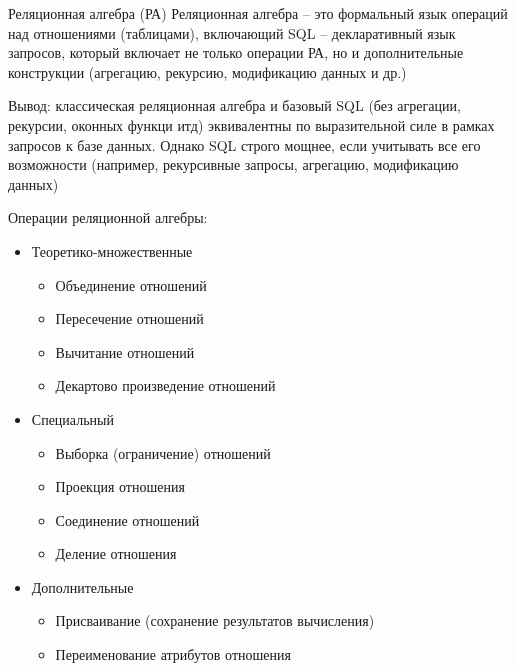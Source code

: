 \documentclass[12pt]{article}
\begin{document}
\begin{defin}{Реляционная алгебра (РА)}
    Реляционная алгебра -- это формальный язык операций над отношениями (таблицами), включающий SQL -- декларативный язык запросов, который включает не только операции РА, но и дополнительные конструкции (агрегацию, рекурсию, модификацию данных и др.)

    Вывод: классическая реляционная алгебра и базовый SQL (без агрегации, рекурсии, оконных функци итд) эквивалентны по выразительной силе в рамках запросов к базе данных. Однако SQL строго мощнее, если учитывать все его возможности (например, рекурсивные запросы, агрегацию, модификацию данных)

    Операции реляционной алгебры:

    \begin{itemize}
        \item Теоретико-множественные
        
        \begin{itemize}
            \item Объединение отношений 
            \item Пересечение отношений
            \item Вычитание отношений 
            \item Декартово произведение отношений 
        \end{itemize}

        \item Специальный 
        
        \begin{itemize}
            \item Выборка (ограничение) отношений 
            \item Проекция отношения
            \item Соединение отношений 
            \item Деление отношения 
        \end{itemize}

        \item Дополнительные 
        
        \begin{itemize}
            \item Присваивание (сохранение результатов вычисления)
            \item Переименование атрибутов отношения 
        \end{itemize}
    \end{itemize}
\end{defin}
\end{document}
